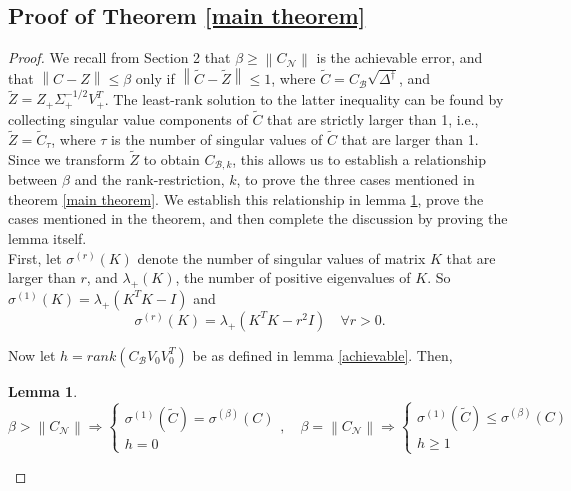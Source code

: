\documentclass[11pt]{article}
\newtheorem{lemma}[theorem]{Lemma}
\newcommand{\norm}[1]{\left\|#1\right\|}
\newcommand{\B}{\mathcal{B}}
\newcommand{\N}{\mathcal{N}}
\newcommand{\0}{\ensuremath{\mathbf{0}}}
\renewcommand{\>}{\succ}
\newcommand{\<}{\prec}
\begin{document}
\subsection{Proof of Theorem \ref{main theorem}}
\begin{proof}
We recall from Section 2 that $\beta \geq \norm{C_{\N}}$ is the achievable error, and that $\norm{{C} - {Z}} \leq \beta$ only if $\norm{\tilde{C} - \tilde{Z}} \leq 1$, where $\tilde{C} = C_{\B} \sqrt{\Delta^{\dagger}}$, and $\tilde{Z} = Z_+{\Sigma}^{-1/2}_+V_+^T$. The least-rank solution to the latter inequality can be found by collecting singular value components of $\tilde{C}$ that are strictly larger than 1, i.e., $\tilde{Z} = \tilde{C}_{\tau}$, where $\tau$ is the number of singular values of $\tilde{C}$ that are larger than 1. Since we transform $\tilde Z$ to obtain $C_{\B, k}$, this allows us to establish a relationship between $\beta$ and the rank-restriction, $k$, to prove the three cases mentioned in theorem \ref{main theorem}. We establish this relationship in lemma \ref{lambda plus}, prove the cases mentioned in the theorem, and then complete the discussion by proving the lemma itself.\\  
\noindent First, let $ \sigma^{(r)}(K)$ denote the  number of singular values of matrix $K$ that are larger than $r$, and $\lambda_{+}(K)$, the number of positive eigenvalues of $K$.
So $\sigma^{(1)}(K) = \lambda_{+}(K^T K - I)$ and
\[ \sigma^{(r)}(K) =  \lambda_{+}( K^T K - r^2 I) \quad \forall r > 0. \]

\noindent Now let $h  = rank(C_{\B} V_0 V_0 ^T)$ be as defined in lemma \ref{achievable}. Then, 
\begin{lemma}\label{lambda plus}
\[ \beta > \norm{C_{\N}} \Rightarrow \left\{ \begin{array}{l} \sigma^{(1)}(\tilde{C}) = \sigma^{(\beta)} (C) \\ h = 0 \end{array} \right. , \quad \beta = \norm{C_{\N}} \Rightarrow \left\{ \begin{array}{l} \sigma^{(1)}(\tilde{C}) \leq \sigma^{(\beta)} (C) \\ h \geq 1 \end{array} \right. \]
\end{lemma}


\end{proof}
\end{document}
